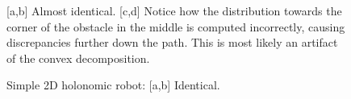 \documentclass[letterpaper]{article}
\begin{document}
\begin{figure}[h]
\begin{center}
\vspace{-20pt}
\end{center}
\caption{ [a,b] Almost identical. [c,d] Notice how the distribution towards the corner of the obstacle in the middle is computed incorrectly, causing discrepancies further down the path. This is most likely an artifact of the convex decomposition.}
\label{fig:panel1}
\end{figure}

\begin{figure}[t]
\begin{center}
\vspace{-20pt}
\end{center}
\caption{ Simple 2D holonomic robot: [a,b] Identical.}
\label{fig:panel4}
\end{figure}
\end{document}

